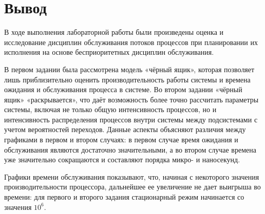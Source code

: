 \section*{Вывод}

В ходе выполнения лабораторной работы были произведены оценка и исследование дисциплин обслуживания потоков процессов при планировании их исполнения на основе бесприоритетных дисциплин обслуживания.

В первом задании была рассмотрена модель «чёрный ящик», которая позволяет лишь приблизительно оценить производительность работы системы и времена ожидания и обслуживания процесса в системе. Во втором задании «чёрный ящик» «раскрывается», что даёт возможность более точно рассчитать параметры системы, включая не только общую интенсивность процессов, но и интенсивность распределения процессов внутри системы между подсистемами с учетом вероятностей переходов. Данные аспекты объясняют различия между графиками в первом и втором случаях: в первом случае время ожидания и обслуживания являются достаточно значительными, а во втором случае времена уже значительно сокращаются и составляют порядка микро- и наносекунд.

Графики времени обслуживания показывают, что, начиная с некоторого значения производительности процессора, дальнейшее ее увеличение не дает выигрыша во времени: для первого и второго задания стационарный режим начинается со значения $10^6$.
